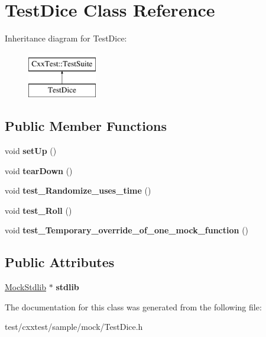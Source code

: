 \hypertarget{classTestDice}{\section{Test\-Dice Class Reference}
\label{classTestDice}
}
Inheritance diagram for Test\-Dice\-:\begin{figure}[H]
\begin{center}
\leavevmode
\includegraphics[height=2.000000cm]{classTestDice}
\end{center}
\end{figure}
\subsection*{Public Member Functions}
\begin{DoxyCompactItemize}
\item 
\hypertarget{classTestDice_afa355b9099f0d55b0272bc19a4a48d65}{void {\bfseries set\-Up} ()}\label{classTestDice_afa355b9099f0d55b0272bc19a4a48d65}

\item 
\hypertarget{classTestDice_a59571b7303434f3f2428090348e140a9}{void {\bfseries tear\-Down} ()}\label{classTestDice_a59571b7303434f3f2428090348e140a9}

\item 
\hypertarget{classTestDice_a8f01fd0ce9316b8e17e4ffe75f5b746d}{void {\bfseries test\-\_\-\-Randomize\-\_\-uses\-\_\-time} ()}\label{classTestDice_a8f01fd0ce9316b8e17e4ffe75f5b746d}

\item 
\hypertarget{classTestDice_ab465c4861d195d3e216e48fd7eceab66}{void {\bfseries test\-\_\-\-Roll} ()}\label{classTestDice_ab465c4861d195d3e216e48fd7eceab66}

\item 
\hypertarget{classTestDice_a8ce1a15a0cfb6a10cceba605593dd38e}{void {\bfseries test\-\_\-\-Temporary\-\_\-override\-\_\-of\-\_\-one\-\_\-mock\-\_\-function} ()}\label{classTestDice_a8ce1a15a0cfb6a10cceba605593dd38e}

\end{DoxyCompactItemize}
\subsection*{Public Attributes}
\begin{DoxyCompactItemize}
\item 
\hypertarget{classTestDice_a6490a7079735d532b0992557f15950de}{\hyperlink{classMockStdlib}{Mock\-Stdlib} $\ast$ {\bfseries stdlib}}\label{classTestDice_a6490a7079735d532b0992557f15950de}

\end{DoxyCompactItemize}


The documentation for this class was generated from the following file\-:\begin{DoxyCompactItemize}
\item 
test/cxxtest/sample/mock/Test\-Dice.\-h\end{DoxyCompactItemize}
